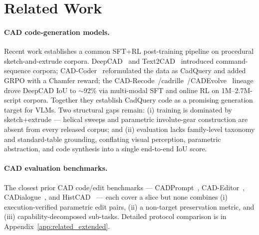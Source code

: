 \section{Related Work}
\label{sec:related}

\begin{table}
  \vspace{-\baselineskip}
  \centering
  \caption{\textbf{BenchCAD positioning.} Benchmark overview for MLLM CAD capabilities.}
  \label{tab:advantages}
  
  \vspace{-0.5\baselineskip}
\end{table}

\paragraph{CAD code-generation models.}
Recent work establishes a common SFT$+$RL post-training pipeline on procedural sketch-and-extrude corpora.
DeepCAD~\citep{Wu2021} and Text2CAD~\citep{Khan2024} introduced command-sequence corpora; CAD-Coder~\citep{Guan2025} reformulated the data as CadQuery and added GRPO with a Chamfer reward; the CAD-Recode~\citep{Rukhovich2025}/cadrille~\citep{Kolodiazhnyi2026}/CADEvolve~\citep{Elistratov2026} lineage drove DeepCAD IoU to $\sim$92\% via multi-modal SFT and online RL on 1M--2.7M-script corpora.
Together they establish CadQuery code as a promising generation target for VLMs.
Two structural gaps remain: (i) training is dominated by sketch+extrude --- helical sweeps and parametric involute-gear construction are absent from every released corpus; and (ii) evaluation lacks family-level taxonomy and standard-table grounding, conflating visual perception, parametric abstraction, and code synthesis into a single end-to-end IoU score.

\paragraph{CAD evaluation benchmarks.}
The closest prior CAD code/edit benchmarks --- CADPrompt~\citep{Alrashedy2025}, CAD-Editor~\citep{CADEditor2025}, CADialogue~\citep{CADialogue2025}, and HistCAD~\citep{Dong2026} --- each cover a slice but none combines (i) execution-verified parametric edit pairs, (ii) a non-target preservation metric, and (iii) capability-decomposed sub-tasks. Detailed protocol comparison is in Appendix~\ref{app:related_extended}.

